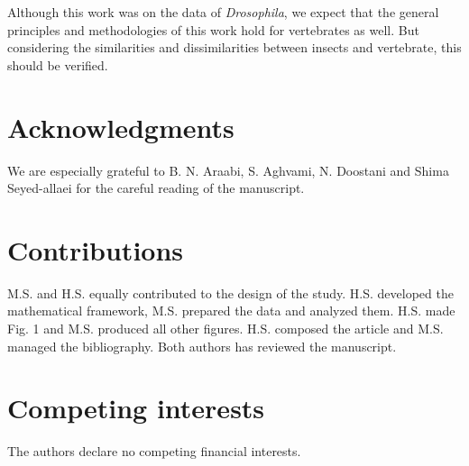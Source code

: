 \documentclass[11pt]{paper} %
\begin{document}
Although this work was on the data of \textit{Drosophila}, 
we expect that the general principles and methodologies of this work hold for vertebrates as well. 
But considering the similarities and dissimilarities between insects and vertebrate, 
this should be verified.


\section*{Acknowledgments}
We are especially grateful to B. N. Araabi, S. Aghvami, N. Doostani and Shima Seyed-allaei for the careful reading of the manuscript.

\printbibliography

%

%


\section*{Contributions}

M.S. and H.S. equally contributed to the design of the study. H.S. developed the mathematical framework, M.S. prepared the data and analyzed them. H.S. made Fig. 1 and M.S. produced all other figures. H.S. composed the article and M.S. managed the bibliography. Both authors has reviewed the manuscript.

\section*{Competing interests}
The authors declare no competing financial interests.
\end{document}
